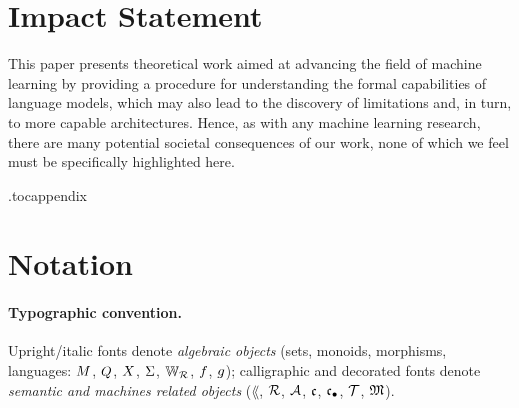\documentclass{article}
\begin{document}
\section*{Impact Statement}
This paper presents theoretical work aimed at advancing the field of machine learning by providing a procedure for understanding the formal capabilities of language models, which may also lead to the discovery of limitations and, in turn, to more capable architectures. Hence, as with any machine learning research, there are many potential societal consequences of our work, none of which we feel must be specifically highlighted here.




\appendix

\onecolumn

\appendix
{}
\onecolumn
\etocdepthtag.toc{appendix}
\begingroup
\small
\setlength{\parskip}{2.9pt}
\tableofcontents
\endgroup

\newpage

\section{Notation}\label{app:notation}

\paragraph{Typographic convention.}
Upright/italic fonts denote \emph{algebraic objects} (sets, monoids, 
morphisms, languages: $M$, $Q$, $X$, $\Sigma$, $\mathbb{W}_{\mathcal{R}}$, 
$f$, $g$); calligraphic and decorated fonts denote 
\emph{semantic and machines related objects} ($\lang$, $\mathcal{R}$, $\mathcal{A}$, 
$\mathfrak{c}$, ${\mathfrak{c}_{\bullet}}$, $\mathcal{T}$, $\mathfrak{M}$).
\end{document}
